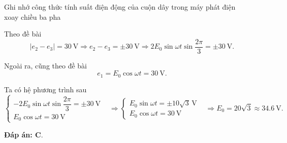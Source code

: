 \begin{dang}{Ghi nhớ công thức tính suất điện động của cuộn dây trong máy phát điện\\ xoay chiều ba pha}
{		Theo đề bài
		\begin{equation*}
			\left| {{e}_{2}}-{{e}_{3}} \right|=\SI{30}{\volt}
			\Rightarrow {{e}_{2}}-{{e}_{3}}=\pm \SI{30}{\volt}
			\Rightarrow 2{{E}_{0}}\sin \omega t\sin \frac{2\pi }{3}=\pm \SI{30}{\volt}.
		\end{equation*}
		
		Ngoài ra, cũng theo đề bài
		\begin{equation*}
			{{e}_{1}}={{E}_{0}}\cos \omega t =\SI{30}{\volt}.
		\end{equation*}
		
		Ta có hệ phương trình sau
		\begin{equation*}
			\left\{\begin{array}{ll}{-2{{E}_{0}}\sin \omega t\sin \dfrac{2\pi}{3}=\pm \SI{30}{\volt}}&\\{{{E}_{0}}\cos \omega t=\SI{30}{\volt}}&\end{array}\right.
			\Rightarrow \left\{\begin{array}{ll}{{{E}_{0}}\sin \omega t=\pm 10\sqrt{3}\,\text{V}}&\\{{{E}_{0}}\cos \omega t=\SI{30}{\volt}}&\end{array}\right.
			\Rightarrow {{E}_{0}}=20\sqrt{3}\approx \SI{34,6}{\volt}.
		\end{equation*}
		
		\textbf{Đáp án: C}.
	}
	
\end{dang}

